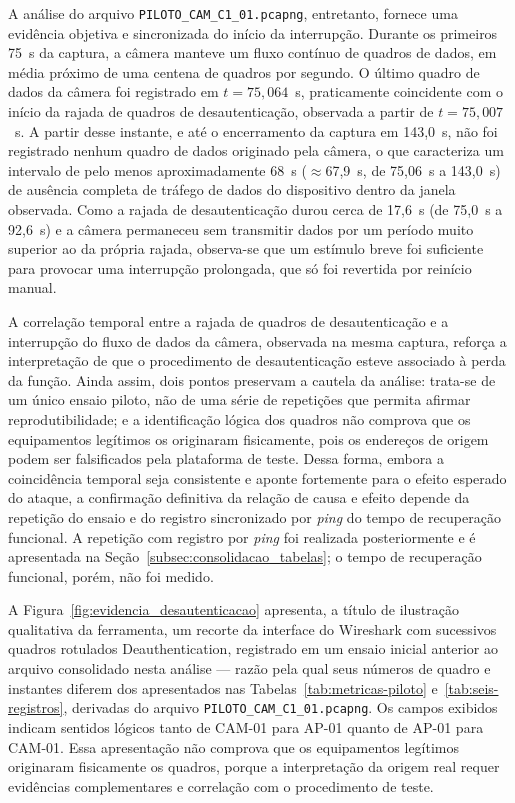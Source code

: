 A análise do arquivo \texttt{PILOTO\_CAM\_C1\_01.pcapng}, entretanto, fornece uma evidência objetiva e sincronizada do início da interrupção. Durante os primeiros 75~s da captura, a câmera manteve um fluxo contínuo de quadros de dados, em média próximo de uma centena de quadros por segundo. O último quadro de dados da câmera foi registrado em $t = 75{,}064$~s, praticamente coincidente com o início da rajada de quadros de desautenticação, observada a partir de $t = 75{,}007$~s. A partir desse instante, e até o encerramento da captura em 143,0~s, não foi registrado nenhum quadro de dados originado pela câmera, o que caracteriza um intervalo de pelo menos aproximadamente 68~s ($\approx$67,9~s, de 75,06~s a 143,0~s) de ausência completa de tráfego de dados do dispositivo dentro da janela observada. Como a rajada de desautenticação durou cerca de 17,6~s (de 75,0~s a 92,6~s) e a câmera permaneceu sem transmitir dados por um período muito superior ao da própria rajada, observa-se que um estímulo breve foi suficiente para provocar uma interrupção prolongada, que só foi revertida por reinício manual.



A correlação temporal entre a rajada de quadros de desautenticação e a interrupção do fluxo de dados da câmera, observada na mesma captura, reforça a interpretação de que o procedimento de desautenticação esteve associado à perda da função. Ainda assim, dois pontos preservam a cautela da análise: trata-se de um único ensaio piloto, não de uma série de repetições que permita afirmar reprodutibilidade; e a identificação lógica dos quadros não comprova que os equipamentos legítimos os originaram fisicamente, pois os endereços de origem podem ser falsificados pela plataforma de teste. Dessa forma, embora a coincidência temporal seja consistente e aponte fortemente para o efeito esperado do ataque, a confirmação definitiva da relação de causa e efeito depende da repetição do ensaio e do registro sincronizado por \textit{ping} do tempo de recuperação funcional. A repetição com registro por \textit{ping} foi realizada posteriormente e é apresentada na Seção~\ref{subsec:consolidacao_tabelas}; o tempo de recuperação funcional, porém, não foi medido.



A Figura~\ref{fig:evidencia_desautenticacao} apresenta, a título de ilustração qualitativa da ferramenta, um recorte da interface do Wireshark com sucessivos quadros rotulados Deauthentication, registrado em um ensaio inicial anterior ao arquivo consolidado nesta análise --- razão pela qual seus números de quadro e instantes diferem dos apresentados nas Tabelas~\ref{tab:metricas-piloto} e~\ref{tab:seis-registros}, derivadas do arquivo \texttt{PILOTO\_CAM\_C1\_01.pcapng}. Os campos exibidos indicam sentidos lógicos tanto de CAM-01 para AP-01 quanto de AP-01 para CAM-01. Essa apresentação não comprova que os equipamentos legítimos originaram fisicamente os quadros, porque a interpretação da origem real requer evidências complementares e correlação com o procedimento de teste.



